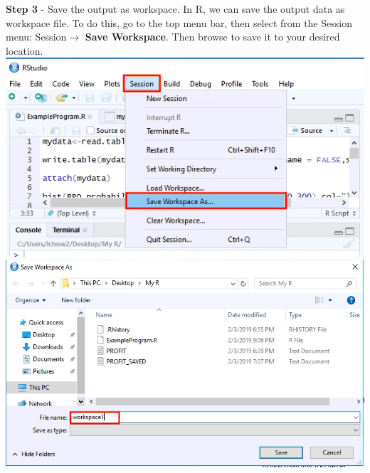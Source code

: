\documentclass[a4paper]{report}
\begin{document}
\begin{flushleft}
            \textbf{Step 3} - Save the output as workspace. In R, we can save the output data as workspace file. To do this, go to the top menu bar, then select from the Session menu: Session$\longrightarrow$ \textbf{Save Workspace}. Then browse to save it to your desired location.
            \newline \newline
                    \includegraphics[width=\textwidth]{images/SAVE4.png}
                    \includegraphics[width=\textwidth]{images/SAVE5.png}
                    
            \newpage
            

\end{flushleft}
\end{document}
